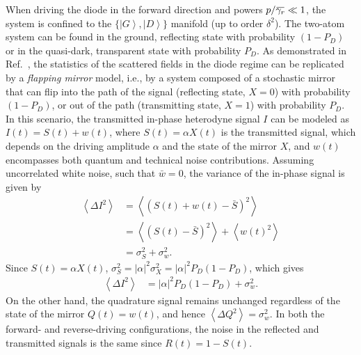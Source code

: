 \documentclass[pra, twocolumn, amsmath, amssymb, notitlepage, longbibliography, showpacs, superscriptaddress]{revtex4-1}
\newcommand{\ket}[1]{\ensuremath{\left|#1\r\rangle}}
\newcommand{\mean}[1]{\ensuremath{\left\langle #1\r\rangle}}
\renewcommand{\r}[0]{\right}
\newcommand{\overbar}[1]{\mkern 1.5mu\overline{\mkern-1.5mu#1\mkern-1.5mu}\mkern 1.5mu}
\begin{document}
When driving the diode in the forward direction and powers $p/\overbar{\gamma_r} \ll 1$,
the system is confined to the $\{\ket{G}, \ket{D}\}$ manifold (up to order $\delta^2$). 
The two-atom system can be found in the ground, reflecting state with probability $(1-P_D)$
or in the quasi-dark, transparent state with probability $P_D$.
As demonstrated in Ref.~\cite{Muller2017a}, the statistics of the 
scattered fields in the diode regime can be replicated 
by a \emph{flapping mirror} model, i.e., by a system composed 
of a stochastic mirror that can flip into the path of the 
signal (reflecting state, $X=0$) with probability $(1-P_D)$,
or out of the path (transmitting state, $X=1$) with probability $P_D$. 
In this scenario, the transmitted in-phase heterodyne signal $I$ can
be modeled as $I(t) = S(t) + w(t)$,
where $S(t) = \alpha X(t)$ is the transmitted signal, which
depends on the driving amplitude $\alpha$ and the state of the mirror $X$,
and $w(t)$ encompasses both quantum and technical noise contributions.
Assuming uncorrelated white noise, such that $\bar{w}=0$, 
the variance of the in-phase signal is given by 
\begin{align*}
\mean{\Delta I^2} &= \mean{(S(t) + w(t) -\bar{S})^2}  \\
                  &= \mean{(S(t)-\bar{S})^2} + \mean{w(t)^2} \\
                  &= \sigma_S^2 + \sigma_w^2.  
\end{align*}
Since $S(t)=\alpha X(t)$, $\sigma_S^2 = |\alpha|^2 \sigma_X^2 = |\alpha|^2 P_D (1-P_D)$,
which gives
\begin{align*}
\mean{\Delta I^2} &= |\alpha|^2 P_D (1-P_D) + \sigma_w^2.  
\end{align*}
On the other hand, the quadrature signal remains unchanged regardless
of the state of the mirror $Q(t) = w(t)$,
and hence $\mean{\Delta Q^2} = \sigma_w^2$. In both the forward- and reverse-driving configurations, 
the noise in the reflected and transmitted signals is the same since $R(t) = 1 - S(t)$.

\end{document}
